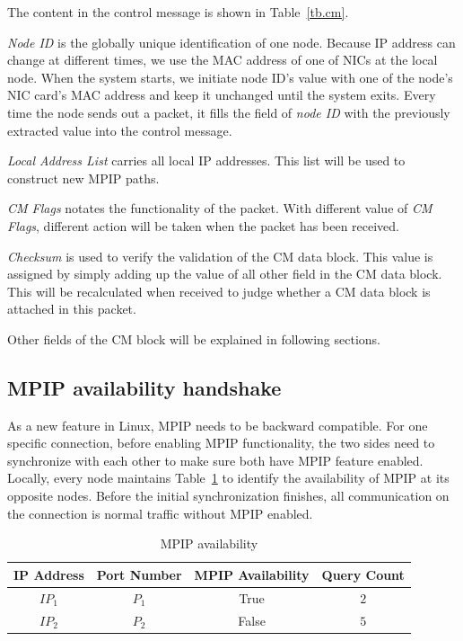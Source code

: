 The content in the control message is shown in Table~\ref{tb.cm}.

\emph{Node ID} is the globally unique identification of one node. Because IP address can change at different times, we use the MAC address of one of NICs at the local node. When the system starts, we initiate node ID\textquoteright s value with one of the node\textquoteright s NIC card\textquoteright s MAC address and keep it unchanged until the system exits. Every time the node sends out a packet, it fills the field of \emph{node ID} with the previously extracted value into the control message.

\emph{Local Address List} carries all local IP addresses. This list will be used to construct new MPIP paths.

\emph{CM Flags} notates the functionality of the packet. With different value of \emph{CM Flags}, different action will be taken when the packet has been received. 

\emph{Checksum} is used to verify the validation of the CM data block. This value is assigned by simply adding up the value of all other field in the CM data block. This will be recalculated when received to judge whether a CM data block is attached in this packet.

Other fields of the CM block will be explained in following sections.

\subsection{MPIP availability handshake}

As a new feature in Linux, MPIP needs to be backward compatible. For one specific connection, before enabling MPIP functionality, the two sides need to synchronize with each other to make sure both have MPIP feature enabled. Locally, every node maintains Table~\ref{tb.me} to identify the availability of MPIP at its opposite nodes. Before the initial synchronization finishes, all communication on the connection is normal traffic without MPIP enabled.

\begin{table}[htbp]
\caption{\label{tb.me}MPIP availability}
\centering
\begin{tabular}{|c|c|c|c|}
\hline
IP Address & Port Number & MPIP Availability & Query Count\\
\hline
${IP}_{1}$ & ${P}_{1}$ & True  & $2$ \\
\hline
${IP}_{2}$ & ${P}_{2}$ & False & $5$ \\
\hline
\end{tabular}
\end{table}


